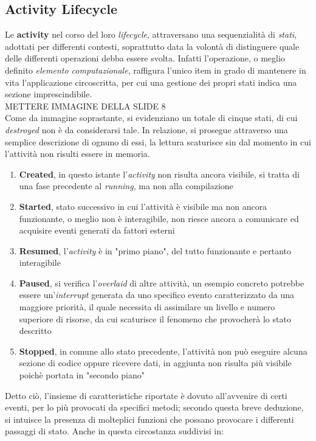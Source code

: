 \documentclass{article}
\begin{document}
\subsection*{Activity Lifecycle} 
Le \textbf{activity} nel corso del loro \textit{lifecycle}, attraversano una sequenzialità di \textit{stati}, adottati per differenti contesti, soprattutto data la volontà di distinguere quale delle differenti operazioni debba essere svolta. Infatti l'operazione, o meglio definito \textit{elemento computazionale}, raffigura l'unico item in grado di mantenere in vita l'applicazione circoscritta, per cui una gestione dei propri stati indica una sezione imprescindibile.\vspace*{14pt}\\
METTERE IMMAGINE DELLA SLIDE 8\vspace*{14pt}\\
Come da immagine soprastante, si evidenziano un totale di cinque stati, di cui \textit{destroyed} non è da considerarsi tale. In relazione, si prosegue attraverso una semplice descrizione di ognuno di essi, la lettura scaturisce sin dal momento in cui l'attività non risulti essere in memoria.
\begin{enumerate}
  \renewcommand{\labelenumi}{-}
  \item \textbf{Created}, in questo istante l'\textit{activity} non risulta ancora visibile, si tratta di una fase precedente al \textit{running}, ma non alla compilazione
  \item \textbf{Started}, stato successivo in cui l'attività è visibile ma non ancora funzionante, o meglio non è interagibile, non riesce ancora a comunicare ed acquisire eventi generati da fattori esterni
  \item \textbf{Resumed}, l'\textit{activity} è in "primo piano", del tutto funzionante e pertanto interagibile
  \item \textbf{Paused}, si verifica l'\textit{overlaid} di altre attività, un esempio concreto potrebbe essere un'\textit{interrupt} generata da uno specifico evento caratterizzato da una maggiore priorità, il quale necessita di assimilare un livello e numero superiore di risorse, da cui scaturisce il fenomeno che provocherà lo stato descritto
  \item \textbf{Stopped}, in comune allo stato precedente, l'attività non può eseguire alcuna sezione di codice oppure ricevere dati, in aggiunta non risulta più visibile poichè portata in "secondo piano"
\end{enumerate}   
Detto ciò, l'insieme di caratteristiche riportate è dovuto all'avvenire di certi eventi, per lo più provocati da specifici metodi; secondo questa breve deduzione, si intuisce la presenza di molteplici funzioni che possano provocare i differenti passaggi di stato. Anche in questa circostanza suddivisi in:
\end{document}
